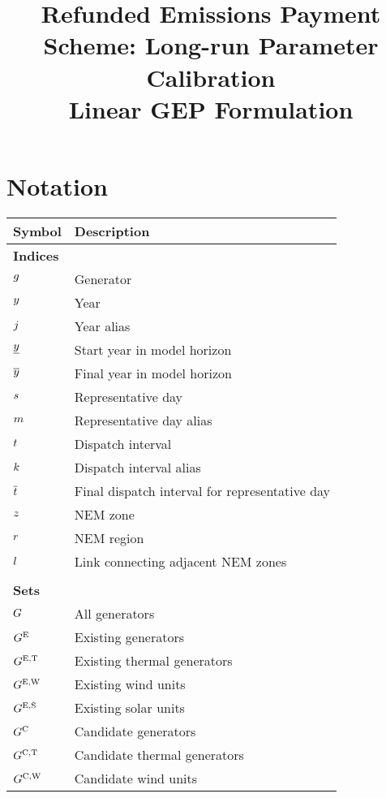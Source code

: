 \documentclass{article}
\title{Refunded Emissions Payment Scheme: Long-run Parameter Calibration\\Linear GEP Formulation}
\begin{document}
	\maketitle
	
	\section{Notation}
	\renewcommand*{\arraystretch}{1.3}
	\begin{longtable}{ p{}  p{}}
		\textbf{Symbol} & \textbf{Description}\\
		\hline\hline
		\multicolumn{2}{l}{\textbf{Indices}}\\
		$g$ & Generator\\ 
		$y$ & Year\\
		$j$ & Year alias\\
		$\underline{y}$ & Start year in model horizon\\
		$\overline{y}$ & Final year in model horizon\\
		$s$ & Representative day\\
		$m$ & Representative day alias\\
		$t$ & Dispatch interval\\
		$k$ & Dispatch interval alias\\
		$\overline{t}$ & Final dispatch interval for representative day\\
		$z$ & NEM zone\\
		$r$ & NEM region\\
		$l$ & Link connecting adjacent NEM zones\\
		& \\
		\multicolumn{2}{l}{\textbf{Sets}}\\
		$G$ & All generators\\
		$G^{\mathrm{E}}$ & Existing generators\\
		$G^{\mathrm{E,T}}$ & Existing thermal generators\\
		$G^{\mathrm{E,W}}$ & Existing wind units\\
		$G^{\mathrm{E,S}}$ & Existing solar units\\
		$G^{\mathrm{C}}$ & Candidate generators\\
		$G^{\mathrm{C,T}}$ & Candidate thermal generators\\
		$G^{\mathrm{C,W}}$ & Candidate wind units\\

\end{longtable}
\end{document}
